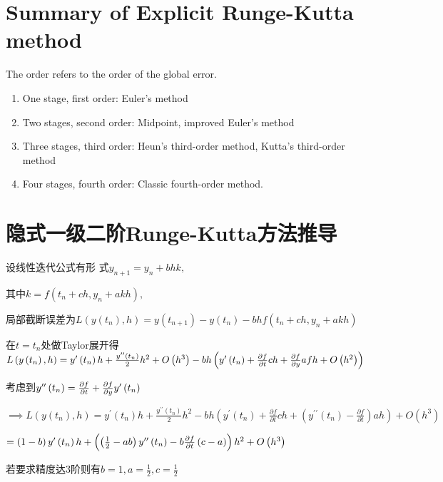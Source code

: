 \documentclass{ctexart}
\begin{document}
\section{Summary of Explicit Runge-Kutta method}
The order refers to the order of the global error.
\begin{enumerate}
\item One stage, first order: Euler's method
\item Two stages, second order: Midpoint, improved Euler's method \cite{heun}
\item Three stages, third order: Heun's third-order method, Kutta's third-order method
\item Four stages, fourth order: Classic fourth-order method.
\end{enumerate}
\section{隐式一级二阶Runge-Kutta方法推导}

设线性迭代公式有形%
式$y_{n+1}=y_{n}+bhk,$

其中$k=f\left( t_{n}+ch,y_{n}+akh\right) ,$

局部截断误差为$L\left( y\left(
t_{n}\right) ,h\right) =y\left( t_{n+1}\right) -y\left( t_{n}\right)
-bhf\left( t_{n}+ch,y_{n}+akh\right) $

在$t=t_{n}$处做Taylor展开得$L\left(
y\left( t_{n}\right) ,h\right) =y^{\prime }\left( t_{n}\right) h+\frac{%
y^{\prime \prime }\left( t_{n}\right) }{2}h^{2}+O\left( h^{3}\right)
-bh\left( y^{\prime }\left( t_{n}\right) +\frac{\partial f}{\partial t}ch+%
\frac{\partial f}{\partial y}afh+O\left( h^{2}\right) \right) $

考虑到$y^{\prime \prime }\left( t_{n}\right) =\frac{%
\partial f}{\partial t}+\frac{\partial f}{\partial y}y^{\prime }\left(
t_{n}\right) $

$\implies L\left( y\left( t_{n}\right) ,h\right) =y^{\prime }\left(
t_{n}\right) h+\frac{y^{\prime \prime }\left( t_{n}\right) }{2}%
h^{2}-bh\left( y^{\prime }\left( t_{n}\right) +\frac{\partial f}{\partial t}%
ch+\left( y^{\prime \prime }\left( t_{n}\right) -\frac{\partial f}{\partial t%
}\right) ah\right) +O\left( h^{3}\right) $

$=\left( 1-b\right) y^{\prime }\left( t_{n}\right) h+\left( \left( \frac{1}{2%
}-ab\right) y^{\prime \prime }\left( t_{n}\right) -b\frac{\partial f}{%
\partial t}\left( c-a\right) \right) h^{2}+O\left( h^{3}\right) $

若要求精度达3阶则有$%
b=1,a=\frac{1}{2},c=\frac{1}{2}$
\end{document}
